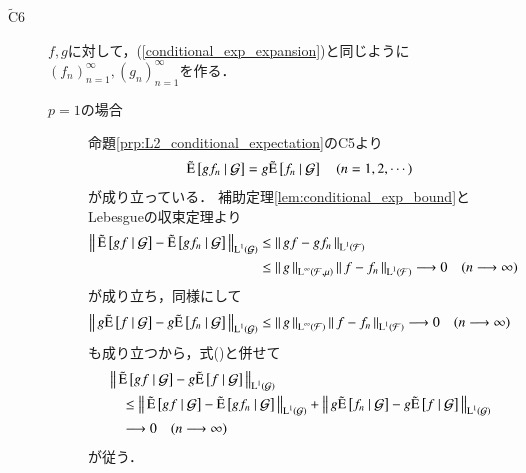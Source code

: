 \begin{prf}
\begin{description}
			\item[$\tilde{\mathrm{C}}$6]
				$f,g$に対して，(\ref{conditional_exp_expansion})と同じように$(f_n)_{n=1}^{\infty},(g_n)_{n=1}^{\infty}$を作る．
				\begin{description}
					\item[$p=1$の場合]
						命題\ref{prp:L2_conditional_expectation}のC5より
						\begin{align}
							\tcexp{gf_n}{\mathcal{G}} = g\tcexp{f_n}{\mathcal{G}}
							\quad (n=1,2,\cdots) \label{eq:conditional_exp_L1}
						\end{align}
						が成り立っている．
						補助定理\ref{lem:conditional_exp_bound}とLebesgueの収束定理より
						\begin{align}
							\Norm{\tcexp{gf}{\mathcal{G}} - \tcexp{gf_n}{\mathcal{G}}}{\Lp{1}{\mathcal{G}}}
							&\leq \Norm{gf - gf_n}{\Lp{1}{\mathcal{F}}} \\
							&\leq \Norm{g}{\Lp{\infty}{\mathcal{F},\mu}}\Norm{f - f_n}{\Lp{1}{\mathcal{F}}}
							\longrightarrow 0 \quad (n \longrightarrow \infty)
						\end{align}
						が成り立ち，同様にして
						\begin{align}
							\Norm{g\tcexp{f}{\mathcal{G}} - g\tcexp{f_n}{\mathcal{G}}}{\Lp{1}{\mathcal{G}}}
							\leq \Norm{g}{\Lp{\infty}{\mathcal{F}}} \Norm{f - f_n}{\Lp{1}{\mathcal{F}}}
							\longrightarrow 0 \quad (n \longrightarrow \infty)
						\end{align}
						も成り立つから，式()と併せて
						\begin{align}
							&\Norm{\tcexp{gf}{\mathcal{G}} - g\tcexp{f}{\mathcal{G}}}{\Lp{1}{\mathcal{G}}} \\
							&\quad \leq \Norm{\tcexp{gf}{\mathcal{G}} - \tcexp{gf_n}{\mathcal{G}}}{\Lp{1}{\mathcal{G}}}
								+ \Norm{g\tcexp{f_n}{\mathcal{G}} - g\tcexp{f}{\mathcal{G}}}{\Lp{1}{\mathcal{G}}} \\
							&\quad \longrightarrow 0 \quad (n \longrightarrow \infty)
						\end{align}
						が従う．
						

\end{description}
\end{description}
\end{prf}
